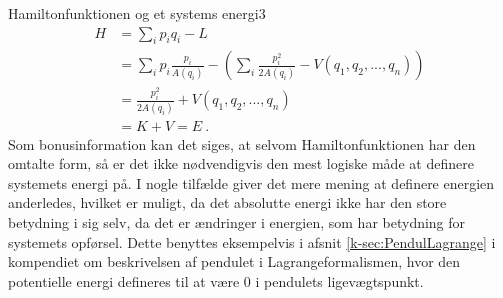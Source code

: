 \begin{opgave}{Hamiltonfunktionen og et systems energi}{3}
\begin{align*}
	H &= \sum_ip_iq_i - L \\
	&= \sum_ip_i\frac{p_i}{A(q_i)} - \left(\sum_i\frac{p_i^2}{2A(q_i)} -  V(q_1,q_2,...,q_n)\right) \\
	&= \frac{p_i^2}{2A(q_i)} +  V(q_1,q_2,...,q_n) \\
	&= K + V = E \: .
\end{align*}
Som bonusinformation kan det siges, at selvom Hamiltonfunktionen har den omtalte form, så er det ikke nødvendigvis den mest logiske måde at definere systemets energi på. I nogle tilfælde giver det mere mening at definere energien anderledes, hvilket er muligt, da det absolutte energi ikke har den store betydning i sig selv, da det er ændringer i energien, som har betydning for systemets opførsel. Dette benyttes eksempelvis i afsnit \ref{k-sec:PendulLagrange} i kompendiet om beskrivelsen af pendulet i Lagrangeformalismen, hvor den potentielle energi defineres til at være $0$ i pendulets ligevægtspunkt.
\end{opgave}
%
%
